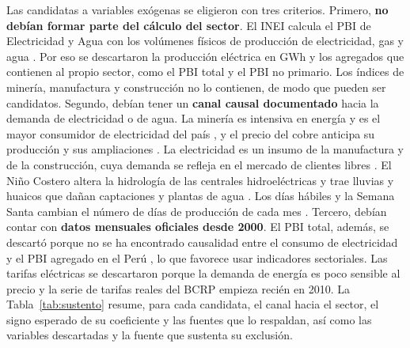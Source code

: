\documentclass[conference]{IEEEtran}
\begin{document}
Las candidatas a variables exógenas se eligieron con tres criterios. Primero, \textbf{no debían formar parte del cálculo del sector}. El INEI calcula el PBI de Electricidad y Agua con los volúmenes físicos de producción de electricidad, gas y agua \cite{inei2017}. Por eso se descartaron la producción eléctrica en GWh y los agregados que contienen al propio sector, como el PBI total y el PBI no primario. Los índices de minería, manufactura y construcción no lo contienen, de modo que pueden ser candidatos. Segundo, debían tener un \textbf{canal causal documentado} hacia la demanda de electricidad o de agua. La minería es intensiva en energía \cite{norgate2010} y es el mayor consumidor de electricidad del país \cite{bcrp_moneda198}, y el precio del cobre anticipa su producción y sus ampliaciones \cite{bcrp_moneda198}. La electricidad es un insumo de la manufactura y de la construcción, cuya demanda se refleja en el mercado de clientes libres \cite{peralta2021}. El Niño Costero altera la hidrología de las centrales hidroeléctricas y trae lluvias y huaicos que dañan captaciones y plantas de agua \cite{takahashi2015,lavado2013,inei2017}. Los días hábiles y la Semana Santa cambian el número de días de producción de cada mes \cite{bell1983,hong2016}. Tercero, debían contar con \textbf{datos mensuales oficiales desde 2000}. El PBI total, además, se descartó porque no se ha encontrado causalidad entre el consumo de electricidad y el PBI agregado en el Perú \cite{yoo2010}, lo que favorece usar indicadores sectoriales. Las tarifas eléctricas se descartaron porque la demanda de energía es poco sensible al precio \cite{labandeira2017} y la serie de tarifas reales del BCRP empieza recién en 2010. La Tabla~\ref{tab:sustento} resume, para cada candidata, el canal hacia el sector, el signo esperado de su coeficiente y las fuentes que lo respaldan, así como las variables descartadas y la fuente que sustenta su exclusión.
\end{document}
